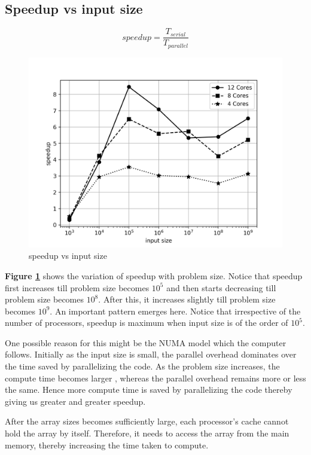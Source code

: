 \documentclass[12,a4paper]{article}
\begin{document}
    \subsection{Speedup vs input size}
    \begin{equation}
        speedup = \frac{T_{serial}}{T_{parallel}}
    \end{equation}
    \begin{figure}[H]
        \centering
        \includegraphics[width=\textwidth]{speedup_size.png}
        \caption{speedup vs input size}
        \label{fig:q1p3}
    \end{figure}
    \textbf{Figure \ref{fig:q1p3}} shows the variation of speedup with problem size. Notice that speedup first increases till problem size becomes $10^5$ and then starts decreasing till problem size becomes $10^8$. After this, it increases slightly till problem size becomes $10^9$. An important pattern emerges here. Notice that irrespective of the number of processors, speedup is maximum when input size is of the order of $10^5$.
    
    One possible reason for this might be the NUMA model which the computer follows. Initially as the input size is small, the parallel overhead dominates over the time saved by parallelizing the code. As the problem size increases, the compute time becomes larger , whereas the parallel overhead remains more or less the same. Hence more compute time is saved by parallelizing the code thereby giving us greater and greater speedup.
    
    After the array sizes becomes sufficiently large, each processor's cache cannot hold the array by itself. Therefore, it needs to access the array from the main memory, thereby increasing the time taken to compute.
\end{document}
